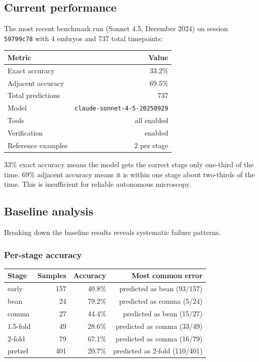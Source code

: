 \documentclass[11pt, a4paper]{article}
\begin{document}
\subsection{Current performance}

The most recent benchmark run (Sonnet 4.5, December 2024) on session
\texttt{59799c78} with 4 embryos and 737 total timepoints:

\begin{center}
\begin{tabular}{@{}lr@{}}
\toprule
\textbf{Metric} & \textbf{Value} \\
\midrule
Exact accuracy         & 33.2\% \\
Adjacent accuracy      & 69.5\% \\
Total predictions      & 737 \\
Model                  & \texttt{claude-sonnet-4-5-20250929} \\
Tools                  & all enabled \\
Verification           & enabled \\
Reference examples     & 2 per stage \\
\bottomrule
\end{tabular}
\end{center}

33\% exact accuracy means the model gets the correct stage only one-third of the
time. 69\% adjacent accuracy means it is within one stage about two-thirds of the
time. This is insufficient for reliable autonomous microscopy.

\subsection{Baseline analysis}

Breaking down the baseline results reveals systematic failure patterns.

\subsubsection{Per-stage accuracy}

\begin{center}
\small
\begin{tabular}{@{}lrrr@{}}
\toprule
\textbf{Stage} & \textbf{Samples} & \textbf{Accuracy} & \textbf{Most common error} \\
\midrule
early    & 157 & 40.8\% & predicted as bean (93/157) \\
bean     &  24 & 79.2\% & predicted as comma (5/24) \\
comma    &  27 & 44.4\% & predicted as bean (15/27) \\
1.5-fold &  49 & 28.6\% & predicted as comma (33/49) \\
2-fold   &  79 & 67.1\% & predicted as comma (16/79) \\
pretzel  & 401 & 20.7\% & predicted as 2-fold (110/401) \\
\bottomrule
\end{tabular}
\end{center}
\end{document}
